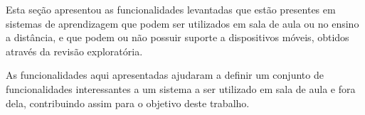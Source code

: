 Esta seção apresentou as funcionalidades levantadas que estão presentes em sistemas de aprendizagem que podem ser utilizados em sala de aula ou no ensino a distância, e que podem ou não possuir suporte a dispositivos móveis, obtidos através da revisão exploratória.

As funcionalidades aqui apresentadas ajudaram a definir um conjunto de funcionalidades interessantes a um sistema a ser utilizado em sala de aula e fora dela, contribuindo assim para o objetivo deste trabalho.